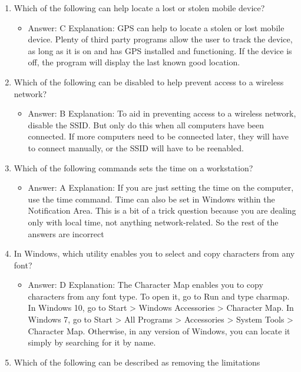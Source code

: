 \documentclass{article}
\begin{document}
\begin{enumerate}
\begin{itemize}
    \end{itemize}
    \item Which of the following can help locate a lost or stolen mobile
device?
    \begin{itemize}
        \item Answer: C
Explanation: GPS can help to locate a stolen or lost mobile device. Plenty of third party
programs allow the user to track the device, as long as it is on and has GPS
installed and functioning. If the device is off, the program will display the last known
good location.
    \end{itemize}
    \item Which of the following can be disabled to help prevent access to a
wireless network?
    \begin{itemize}
        \item Answer: B
Explanation: To aid in preventing access to a wireless network, disable the SSID. But
only do this when all computers have been connected. If more computers need to be
connected later, they will have to connect manually, or the SSID will have to be reenabled.
    \end{itemize}
    \item Which of the following commands sets the time on a workstation?
    \begin{itemize}
        \item Answer: A
Explanation: If you are just setting the time on the computer, use the time command.
Time can also be set in Windows within the Notification Area. This is a bit of a trick
question because you are dealing only with local time, not anything network-related.
So the rest of the answers are incorrect
    \end{itemize}
    \item In Windows, which utility enables you to select and copy characters
from any font?
    \begin{itemize}
        \item Answer: D
Explanation: The Character Map enables you to copy characters from any font type.
To open it, go to Run and type charmap. In Windows 10, go to Start > Windows
Accessories > Character Map. In Windows 7, go to Start > All Programs > Accessories >
System Tools > Character Map. Otherwise, in any version of Windows, you can locate
it simply by searching for it by name.
    \end{itemize}
    \item Which of the following can be described as removing the limitations

\end{enumerate}
\end{document}
